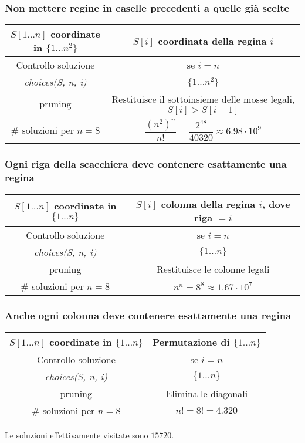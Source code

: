 \subsubsection{Non mettere regine in caselle precedenti a quelle gi\`a scelte}
\begin{tabular}{|c|c|}
	\hline
	$S[1\dots n]$ coordinate in $\{1\dots n^2\}$ & $S[i]$ coordinata della regina $i$\\
	\hline
	Controllo soluzione & se $i = n$ \\
	\hline
	\emph{choices(S, n, i)} & $\{1\dots n^2\}$\\
	\hline
	pruning & Restituisce il sottoinsieme delle mosse legali, $S[i]>S[i-1]$\\
	\hline
	$\#$ soluzioni per $n=8$ & $\dfrac{(n^2)^n}{n!} = \dfrac{2^{48}}{40320}\approx 6.98\cdot 10^{9}$\\
	\hline
\end{tabular}
\subsubsection{Ogni riga della scacchiera deve contenere esattamente una regina}
\begin{tabular}{|c|c|}
	\hline
	$S[1\dots n]$ coordinate in $\{1\dots n\}$ & $S[i]$ colonna della regina $i$, dove riga $= i$\\
	\hline
	Controllo soluzione & se $i = n$ \\
	\hline
	\emph{choices(S, n, i)} & $\{1\dots n\}$\\
	\hline
	pruning & Restituisce le colonne legali\\
	\hline
	$\#$ soluzioni per $n=8$ & $n^n = 8^8\approx 1.67\cdot 10^{7}$\\
	\hline
\end{tabular}
\subsubsection{Anche ogni colonna deve contenere esattamente una regina}
\begin{tabular}{|c|c|}
	\hline
	$S[1\dots n]$ coordinate in $\{1\dots n\}$ & Permutazione di $\{1\dots n\}$\\
	\hline
	Controllo soluzione & se $i = n$ \\
	\hline
	\emph{choices(S, n, i)} & $\{1\dots n\}$\\
	\hline
	pruning & Elimina le diagonali\\
	\hline
	$\#$ soluzioni per $n=8$ & $n! = 8! = 4.320$\\
	\hline
\end{tabular}
Le soluzioni effettivamente visitate sono $15720$.
